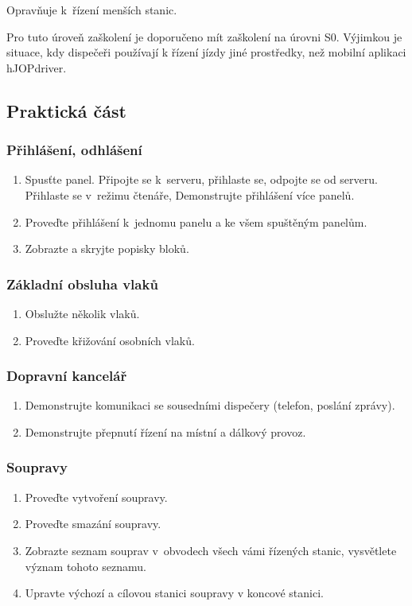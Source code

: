\documentclass[12pt,a4paper]{article}
\begin{document}
Opravňuje k~řízení menších stanic.

Pro tuto úroveň zaškolení je doporučeno mít zaškolení na úrovni S0. Výjimkou
je situace, kdy dispečeři používají k řízení jízdy jiné prostředky, než mobilní
aplikaci hJOPdriver.

\subsection{Praktická část}

\subsubsection*{Přihlášení, odhlášení}
\begin{enumerate}[leftmargin=*]
\item Spusťte panel. Připojte se k~serveru, přihlaste se, odpojte se od
serveru. Přihlaste se v~režimu čtenáře, Demonstrujte přihlášení více panelů.
\item Proveďte přihlášení k~jednomu panelu a ke všem spuštěným panelům.
\item Zobrazte a skryjte popisky bloků.
\end{enumerate}

\subsubsection*{Základní obsluha vlaků}
\begin{enumerate}[leftmargin=*]
\item Obslužte několik vlaků.
\item Proveďte křižování osobních vlaků.
\end{enumerate}

\subsubsection*{Dopravní kancelář}
\begin{enumerate}[leftmargin=*]
\item Demonstrujte komunikaci se sousedními dispečery (telefon, poslání zprávy).
\item Demonstrujte přepnutí řízení na místní a dálkový provoz.
\end{enumerate}

\subsubsection*{Soupravy}
\begin{enumerate}[leftmargin=*]
\item Proveďte vytvoření soupravy.
\item Proveďte smazání soupravy.
\item Zobrazte seznam souprav v~obvodech všech vámi řízených stanic, vysvětlete
význam tohoto seznamu.
\item Upravte výchozí a cílovou stanici soupravy v koncové stanici.
\end{enumerate}
\end{document}
